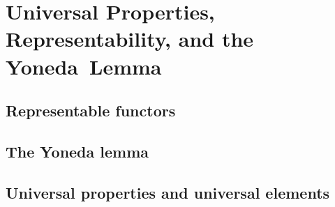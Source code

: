 \chapter{Universal Properties, Representability, and the Yoneda~Lemma}

\section{Representable functors}






\section{The Yoneda lemma}








\section{Universal properties and universal elements}



